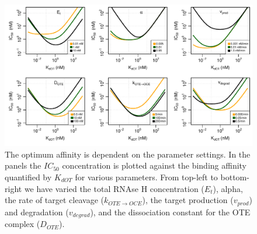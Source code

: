 \documentclass[a4paper,11pt]{article}
\newenvironment{Ncenter}{%
  \setlength\topsep{-10pt}
  \setlength\parskip{-100pt}
  \begin{center}
}{%
  \end{center}
}
\begin{document}
\begin{figure}[!h]
\begin{Ncenter}
\includegraphics[width=\textwidth]{SuppFile1-S2.pdf}
\end{Ncenter}
\caption{The optimum affinity is dependent on the parameter settings. In the panels the $IC_{50}$ concentration is plotted against the binding affinity quantified by $K_{dOT}$ for various parameters. From top-left to bottom-right we have varied the total RNAse H concentration ($E_t$), alpha, the rate of target cleavage ($k_{OTE \to OCE}$), the target production ($v_{prod}$) and degradation ($v_{degrad}$), and the dissociation constant for the OTE complex ($D_{OTE}$).}\label{fig::Opt}
\end{figure}
\end{document}
